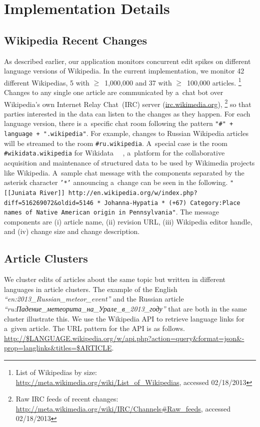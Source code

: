 \documentclass{sig-alternate}
\newcommand{\inlinelistingsize}{\fontsize{8pt}{11pt}}
\let\oldurl\url
\renewcommand{\url}[1]{\inlinelistingsize\oldurl{#1}}
\begin{document}
\section{Implementation Details}

\subsection{Wikipedia Recent Changes}
\label{sec:wikipedia-recent-changes}

As described earlier, our application monitors concurrent edit spikes
on different language versions of Wikipedia.
In the current implementation, we monitor 42 different Wiki\-pedias, 5 with 
$\geq$~1,000,000 and 37 with $\geq$~100,000 articles.%
\footnote{List of Wikipedias by size: \url{http://meta.wikimedia.org/wiki/List_of_Wikipedias},
accessed 02/18/2013}
Changes to any single one article are communicated by a~chat bot
over Wikipedia's own Internet Relay Chat~(IRC) server (\url{irc.wikimedia.org}),%
\footnote{Raw IRC feeds of recent changes: \url{http://meta.wikimedia.org/wiki/IRC/Channels\#Raw_feeds}, accessed 02/18/2013}
so that parties interested in the data can listen to the changes as they happen.
For each language version, there is a~specific chat room following the pattern
\texttt{"\#" + language + ".wikipedia"}.
For example, changes to Russian Wikipedia articles will be streamed to the room
\texttt{\#ru.wikipedia}.
A~special case is the room \texttt{\#wikidata.wikipedia} for Wikidata~%
~\cite{vrandecic2012wikidata},
a~platform for the collaborative acquisition and maintenance
of structured data to be used by
Wikimedia projects like Wikipedia.
A~sample chat message with the components separated
by the asterisk character \texttt{'*'}
announcing a~change can be seen in the following.
\texttt{"[[Juniata River]] http://en.wikipedia.org/w/index.php?diff=516269072&oldid=5146 * Johanna-Hypatia * (+67) Category:Place names of Native American origin in Pennsylvania"}.
The message components are (i) article name, (ii) revision URL,
(iii) Wikipedia editor handle, and (iv) change size and change description.

\subsection{Article Clusters}

We cluster edits of articles about the same topic
but written in different languages in article clusters.
The example of the English
\emph{``en:2013\_Russian\_meteor\_event''}
and the Russian article \selectfont
\emph{``ru:Падение\_метеорита\_на\_Урале\_в\_2013\_году''}
\selectfont that are both in the same cluster illustrate this.
We use the Wikipedia API to retrieve language links for a~given article.
The URL pattern for the API is as follows.
\url{http://$LANGUAGE.wikipedia.org/w/api.php?action=query&format=json&-prop=langlinks&titles=$ARTICLE}.
\end{document}

